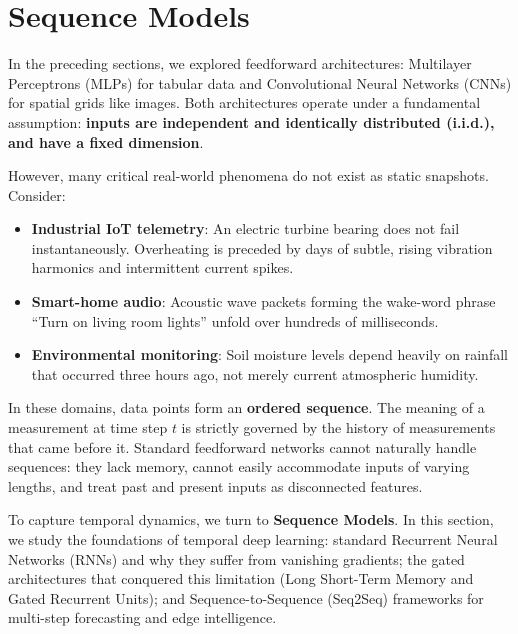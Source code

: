 \section{Sequence Models}\label{sec:sequence_models}

In the preceding sections, we explored feedforward architectures: Multilayer Perceptrons (MLPs) for tabular data and Convolutional Neural Networks (CNNs) for spatial grids like images. Both architectures operate under a fundamental assumption: \textbf{inputs are independent and identically distributed (i.i.d.), and have a fixed dimension}.

However, many critical real-world phenomena do not exist as static snapshots. Consider:
\begin{itemize}
    \item \textbf{Industrial IoT telemetry}: An electric turbine bearing does not fail instantaneously. Overheating is preceded by days of subtle, rising vibration harmonics and intermittent current spikes.
    \item \textbf{Smart-home audio}: Acoustic wave packets forming the wake-word phrase ``Turn on living room lights'' unfold over hundreds of milliseconds.
    \item \textbf{Environmental monitoring}: Soil moisture levels depend heavily on rainfall that occurred three hours ago, not merely current atmospheric humidity.
\end{itemize}

In these domains, data points form an \textbf{ordered sequence}. The meaning of a measurement at time step $t$ is strictly governed by the history of measurements that came before it. Standard feedforward networks cannot naturally handle sequences: they lack memory, cannot easily accommodate inputs of varying lengths, and treat past and present inputs as disconnected features.

To capture temporal dynamics, we turn to \textbf{Sequence Models}. In this section, we study the foundations of temporal deep learning: standard Recurrent Neural Networks (RNNs) and why they suffer from vanishing gradients; the gated architectures that conquered this limitation (Long Short-Term Memory and Gated Recurrent Units); and Sequence-to-Sequence (Seq2Seq) frameworks for multi-step forecasting and edge intelligence.

